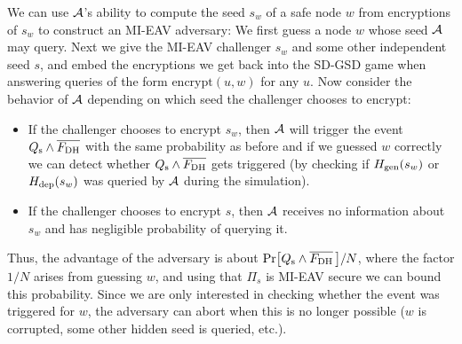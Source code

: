 
We can use $\mathcal{A}$'s ability to compute the seed $s_w$ of a safe node $w$ from encryptions of $s_w$ to construct an MI-EAV adversary: We first guess a node $w$ whose seed $\mathcal{A}$ may query. Next we give the MI-EAV challenger $s_w$ and some other independent seed $s$, and embed the encryptions we get back into the SD-GSD game when answering queries of the form $\mathrm{encrypt}(u, w)$ for any $u$. Now consider the behavior of $\mathcal{A}$ depending on which seed the challenger chooses to encrypt:
\begin{itemize}
	\item If the challenger chooses to encrypt $s_w$, then $\mathcal{A}$ will trigger the event $Q_\mathrm{s} \land \overline{F_\mathrm{DH}}$ with the same probability as before and if we guessed $w$ correctly we can detect whether $Q_\mathrm{s} \land \overline{F_\mathrm{DH}}$ gets triggered (by checking if $H_\mathrm{gen}(s_w)$ or $H_\mathrm{dep}(s_w)$ was queried by $\mathcal{A}$ during the simulation).
	\item If the challenger chooses to encrypt $s$, then $\mathcal{A}$ receives no information about $s_w$ and has negligible probability of querying it.
\end{itemize}
Thus, the advantage of the adversary is about $\pr{\qs \land \overline{\fdh}\,}/N$, where the factor $1/N$ arises from guessing $w$, and using that $\Pi_s$ is MI-EAV secure we can bound this probability. Since we are only interested in checking whether the event was triggered for $w$, the adversary can abort when this is no longer possible ($w$ is corrupted, some other hidden seed is queried, etc.).

